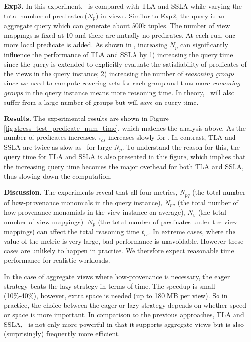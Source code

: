 \textbf{Exp3.} In this experiment, \provalg\ is compared with TLA and SSLA while varying the total number of predicates ($N_p$) in views. Similar to Exp2, the query is an aggregate query which can generate about 500k tuples. The number of view mappings is fixed at 10 and there are initially no predicates. At each run, one more local predicate is added. As shown in \cite{wu2018data}, increasing $N_p$ can significantly influence the performance of TLA and SSLA by 1) increasing the query time since the query is extended to explicitly evaluate the satisfiability of predicates of the views in the query instance; 2) increasing the number of {\em reasoning groups} since we need to compute covering sets for each group and thus more {\em reasoning groups} in the query instance means more reasoning time. In theory, \provalg\ will also suffer from a large number of groups but will save on query time.

\textbf{Results.} The experimental results are shown in Figure \ref{fig:stress_test_predicate_num_time}, which matches the analysis above. As the number of predicates increases, $t_{cs}$ 
increases slowly for \provalg. In contrast, TLA and SSLA are twice as slow as \provalg\ for large $N_p$. To understand the reason for this, the query time for TLA and SSLA is also presented in this figure, which implies that the increasing query time becomes the major overhead for both TLA and SSLA, thus slowing down the computation.

{\bf Discussion.} The experiments reveal that all four metrics, $N_{pq}$ (the total number of how-provenance monomials in the query instance), $N_{pv}$ (the total number of how-provenance monomials in the view instance on average), $N_v$ (the total number of view mappings), $N_p$ (the total number of predicates under the view mappings) can affect the total reasoning time $t_{cs}$. In extreme cases, where the value of the metric is very large, bad performance is unavoidable.  However these cases are unlikely to happen in practice. We therefore expect reasonable time performance for realistic workloads. 

In the case of aggregate views where how-provenance is necessary, the  eager strategy beats the lazy strategy in terms of time.  The speedup is small (10\%-40\%), however, extra space is needed (up to 180 MB per view). So in practice, the choice between the eager or lazy strategy depends on whether speed or space is more important. In comparison to the previous approaches, TLA and SSLA, \provalg\ is not only more powerful in that it supports aggregate views but is also (surprisingly) frequently more efficient.  

